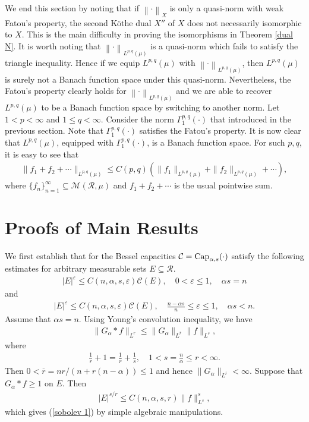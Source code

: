 \documentclass[10pt,reqno]{amsart}
\numberwithin{equation}{section}
\begin{document}
We end this section by noting that if $\left\|\cdot\right\|_{X}$ is only a quasi-norm with weak Fatou's property, the second K\"othe dual $X''$ of $X$ does not necessarily isomorphic to $X$. This is the main difficulty in proving the isomorphisms in Theorem \ref{dual N}. It is worth noting that $\left\|\cdot\right\|_{L^{p,q}(\mu)}$ is a quasi-norm which fails to satisfy the triangle inequality. Hence if we equip $L^{p,q}(\mu)$ with $\left\|\cdot\right\|_{L^{p,q}(\mu)}$, then $L^{p,q}(\mu)$ is surely not a Banach function space under this quasi-norm. Nevertheless, the Fatou's property clearly holds for $\left\|\cdot\right\|_{L^{p,q}(\mu)}$ and we are able to recover $L^{p,q}(\mu)$ to be a Banach function space by switching to another norm. Let $1<p<\infty$ and $1\leq q<\infty$. Consider the norm $\Gamma_{1}^{p,q}(\cdot)$ that introduced in the previous section. Note that $\Gamma_{1}^{p,q}(\cdot)$ satisfies the Fatou's property. It is now clear that $L^{p,q}(\mu)$, equipped with $\Gamma_{1}^{p,q}(\cdot)$, is a Banach function space. For such $p,q$, it is easy to see that 
\begin{align*}
\|f_{1}+f_{2}+\cdots\|_{L^{p,q}(\mu)}\leq C(p,q)(\|f_{1}\|_{L^{p,q}(\mu)}+\|f_{2}\|_{L^{p,q}(\mu)}+\cdots),
\end{align*}
where $\{f_{n}\}_{n=1}^{\infty}\subseteq\mathcal{M}(\mathcal{R},\mu)$ and $f_{1}+f_{2}+\cdots$ is the usual pointwise sum.

\section{Proofs of Main Results}
We first establish that for the Bessel capacities $\mathcal{C}={\rm Cap}_{\alpha,s}(\cdot)$ satisfy the following estimates for arbitrary measurable sets $E\subseteq\mathcal{R}$.
\begin{align}\label{sobolev 1}
|E|^{\varepsilon}\leq C(n,\alpha,s,\varepsilon)\mathcal{C}(E),\quad 0<\varepsilon\leq 1,\quad \alpha s=n
\end{align}
and
\begin{align}\label{sobolev 2}
|E|^{\varepsilon}\leq C(n,\alpha,s,\varepsilon)\mathcal{C}(E),\quad\frac{n-\alpha s}{n}\leq\varepsilon\leq 1,\quad \alpha s<n.
\end{align}
Assume that $\alpha s=n$. Using Young's convolution inequality, we have 
\begin{align*}
\|G_{\alpha}\ast f\|_{L^{r}}\leq\|G_{\alpha}\|_{L^{\overline{r}}}\|f\|_{L^{s}},
\end{align*}
where
\begin{align*}
\frac{1}{r}+1=\frac{1}{\overline{r}}+\frac{1}{s},\quad 1<s=\frac{n}{\alpha}\leq r<\infty.
\end{align*}
Then $0<\overline{r}=nr/(n+r(n-\alpha))\leq 1$ and hence $\|G_{\alpha}\|_{L^{\overline{r}}}<\infty$. Suppose that $G_{\alpha}\ast f\geq 1$ on $E$. Then 
\begin{align*}
|E|^{s/r}\leq C(n,\alpha,s,r)\|f\|_{L^{s}}^{s},
\end{align*}
which gives (\ref{sobolev 1}) by simple algebraic manipulations.
\end{document}
